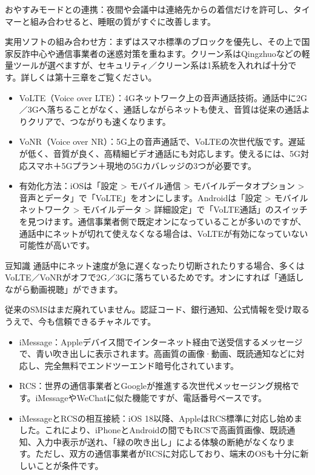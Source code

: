 おやすみモードとの連携：夜間や会議中は連絡先からの着信だけを許可し、タイマーと組み合わせると、睡眠の質がすぐに改善します。

実用ソフトの組み合わせ方：まずはスマホ標準のブロックを優先し、その上で国家反詐中心や通信事業者の迷惑対策を重ねます。クリーン系はQingzhuoなどの軽量ツールが選べますが、セキュリティ／クリーン系は1系統を入れれば十分です。詳しくは第十三章をご覧ください。


\begin{itemize}
  \item VoLTE（Voice over LTE）：4Gネットワーク上の音声通話技術。通話中に2G／3Gへ落ちることがなく、通話しながらネットも使え、音質は従来の通話よりクリアで、つながりも速くなります。
  \item VoNR（Voice over NR）：5G上の音声通話で、VoLTEの次世代版です。遅延が低く、音質が良く、高精細ビデオ通話にも対応します。使えるには、5G対応スマホ＋5Gプラン＋現地の5Gカバレッジの3つが必要です。
  \item 有効化方法：iOSは「設定 > モバイル通信 > モバイルデータオプション > 音声とデータ」で「VoLTE」をオンにします。Androidは「設定 > モバイルネットワーク > モバイルデータ > 詳細設定」で「VoLTE通話」のスイッチを見つけます。通信事業者側で既定オンになっていることが多いのですが、通話中にネットが切れて使えなくなる場合は、VoLTEが有効になっていない可能性が高いです。
\end{itemize}

\begin{tcbinfo}{豆知識}
通話中にネット速度が急に遅くなったり切断されたりする場合、多くはVoLTE／VoNRがオフで2G／3Gに落ちているためです。オンにすれば「通話しながら動画視聴」ができます。

\end{tcbinfo}


従来のSMSはまだ廃れていません。認証コード、銀行通知、公式情報を受け取るうえで、今も信頼できるチャネルです。

\begin{itemize}
  \item iMessage：Appleデバイス間でインターネット経由で送受信するメッセージで、青い吹き出しに表示されます。高画質の画像·動画、既読通知などに対応し、完全無料でエンドツーエンド暗号化されています。
  \item RCS：世界の通信事業者とGoogleが推進する次世代メッセージング規格です。iMessageやWeChatに似た機能ですが、電話番号ベースです。
  \item iMessageとRCSの相互接続：iOS 18以降、AppleはRCS標準に対応し始めました。これにより、iPhoneとAndroidの間でもRCSで高画質画像、既読通知、入力中表示が送れ、「緑の吹き出し」による体験の断絶がなくなります。ただし、双方の通信事業者がRCSに対応しており、端末のOSも十分に新しいことが条件です。
\end{itemize}

